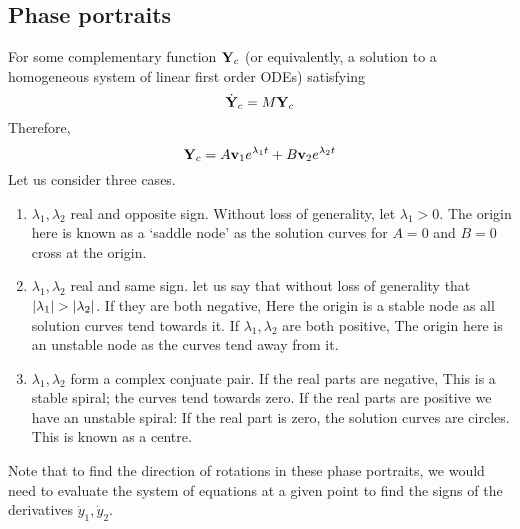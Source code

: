 \subsection{Phase portraits}
For some complementary function \(\vb Y_c\) (or equivalently, a solution to a homogeneous system of linear first order ODEs) satisfying
\begin{equation}\label{phasematrix}
	\dot {\vb Y}_c = M\vb Y_c
\end{equation}
Therefore,
\[
	\vb Y_c = A\vb v_1 e^{\lambda_1 t} + B\vb v_2 e^{\lambda_2 t}
\]
Let us consider three cases.
\begin{enumerate}
	\item \(\lambda_1, \lambda_2\) real and opposite sign.
	      Without loss of generality, let \(\lambda_1 > 0\).
	      The origin here is known as a `saddle node' as the solution curves for \(A=0\) and \(B=0\) cross at the origin.
	\item \(\lambda_1, \lambda_2\) real and same sign.
	      let us say that without loss of generality that \(\abs{\lambda_1} > \abs{\lambda_2}\).
	      If they are both negative, %
	      Here the origin is a stable node as all solution curves tend towards it.
	      If \(\lambda_1, \lambda_2\) are both positive, %
	      The origin here is an unstable node as the curves tend away from it.
	\item \(\lambda_1, \lambda_2\) form a complex conjuate pair.
	      If the real parts are negative, %
	      This is a stable spiral; the curves tend towards zero.
	      If the real parts are positive we have an unstable spiral:
	      If the real part is zero, the solution curves are circles.
	      This is known as a centre.
\end{enumerate}
Note that to find the direction of rotations in these phase portraits, we would need to evaluate the system of equations at a given point to find the signs of the derivatives \(\dot y_1, \dot y_2\).


